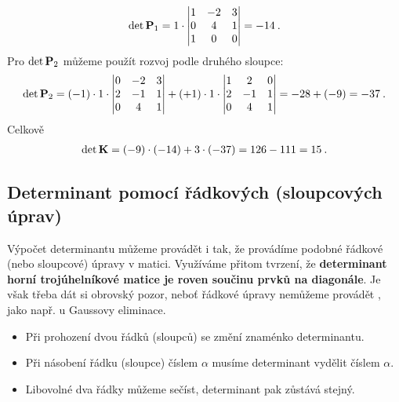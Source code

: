 \begin{itemize}
\begin{example}
        \begin{align}
            \det \mathbf{P}_1 = 1 \cdot
            \begin{vmatrix}
                 1 & -2 & 3 \\
                 0 & 4 & 1 \\
                 1 & 0 & 0
            \end{vmatrix}
            =  -14 \:.
        \end{align}
        Pro $\det \mathbf{P}_2$ můžeme použít rozvoj podle druhého sloupce:
        \begin{align}
            \det \mathbf{P}_2 = (-1) \cdot 1 \cdot \begin{vmatrix}
                0 & -2 & 3 \\
                2 & -1 & 1 \\
                0 & 4 & 1
            \end{vmatrix}
            + (+1) \cdot 1 \cdot
            \begin{vmatrix}
                1 & 2 & 0 \\
                2 & -1 & 1 \\
                0 & 4 & 1
            \end{vmatrix}
            =
            -28 + (-9) = -37 \:.
        \end{align}
        Celkově
        \begin{align}
            \det \mathbf{K} = (-9) \cdot (-14) + 3 \cdot (-37) = 126 - 111 = 15 \:.
        \end{align}
    \end{example}
\end{itemize}

\subsection*{Determinant pomocí řádkových (sloupcových úprav)}

Výpočet determinantu můžeme provádět i tak, že provádíme podobné řádkové (nebo sloupcové) úpravy v matici. Využíváme přitom tvrzení, že \textbf{determinant horní trojúhelníkové matice je roven součinu prvků na diagonále}. Je však třeba dát si obrovský pozor, neboť řádkové úpravy nemůžeme provádět , jako např. u Gaussovy eliminace.
\begin{itemize}
    \item Při prohození dvou řádků (sloupců) se změní znaménko determinantu.
    \item Při násobení řádku (sloupce) číslem $\alpha$ musíme determinant vydělit číslem $\alpha$.
    \item Libovolné dva řádky můžeme sečíst, determinant pak zůstává stejný.
\end{itemize}

